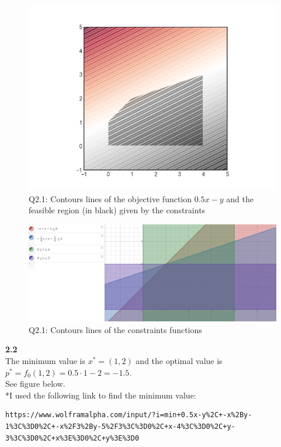 \documentclass[fleqn]{article}
\begin{document}
\begin{figure}[h!]
\includegraphics[width=0.8\linewidth]{q2_1.PNG}
\caption{Q2.1: Contours lines of the objective function $0.5x-y$ and the feasible region (in black) given by the constraints}
\end{figure}

\begin{figure}[h!]
\includegraphics[width=0.8\linewidth]{q2_1_constraints_contours.PNG}
\caption{Q2.1: Contours lines of the constraints functions}
\end{figure}


\textbf{2.2} \\
The minimum value is $x^* = (1,2)$ and the optimal value is $p^* = f_0(1,2) = 0.5 \cdot 1 -2 = -1.5$. \\
See figure below.\\

*I used the following link to find the minimum value: \\
\begin{lstlisting}[breaklines]
https://www.wolframalpha.com/input/?i=min+0.5x-y%2C+-x%2By-1%3C%3D0%2C+-x%2F3%2By-5%2F3%3C%3D0%2C+x-4%3C%3D0%2C+y-3%3C%3D0%2C+x%3E%3D0%2C+y%3E%3D0
\end{lstlisting} 
\end{document}
